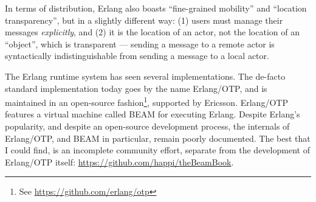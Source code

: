 In terms of distribution, Erlang also boasts ``fine-grained mobility''
and ``location transparency'', but in a slightly different way: (1)
users must manage their messages \emph{explicitly}, and (2) it is the
location of an actor, not the location of an ``object'', which is
transparent --- sending a message to a remote actor is syntactically
indistinguishable from sending a message to a local actor.

The Erlang runtime system has seen several
implementations\cite{erlang:2018:The-Erlang-Runtime-System}. The
de-facto standard implementation today goes by the name Erlang/OTP,
and is maintained in an open-source fashion\footnote{See
\url{https://github.com/erlang/otp}}, supported by Ericsson.
Erlang/OTP features a virtual machine called BEAM for executing
Erlang. Despite Erlang's popularity, and despite an open-source
development process, the internals of Erlang/OTP, and BEAM in
particular, remain poorly documented. The best that I could find, is
an incomplete community effort, separate from the development of
Erlang/OTP itself: \url{https://github.com/happi/theBeamBook}.
